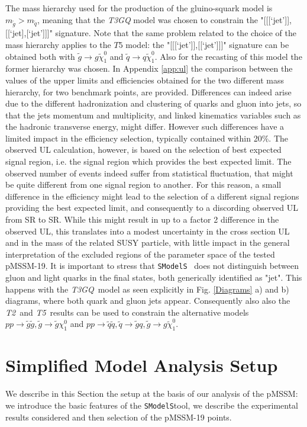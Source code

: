 \documentclass[preprint,number,sort&compress,twocolumn,3p]{elsstyarticle}
\newcommand{\SMO}{\texttt{SModelS\xspace}}
\newcommand{\TGQ}{ \textit{T3GQ}}
\newcommand{\Ttwo}{ \textit{T2}}
\newcommand{\Tfive}{ \textit{T5}}
\begin{document}
The mass hierarchy used for the production of the gluino-squark model is $m_{\tilde g} > m_{\tilde q}$, meaning that the \textit{T3GQ} model was chosen to constrain the "[[[`jet']],[[`jet],[`jet']]]" signature. Note that the same problem related to the choice of the mass hierarchy applies to the $T5$ model: the "[[[`jet']],[[`jet']]]" signature can be obtained both with $\tilde g \rightarrow g \tilde \chi _1 ^0$ and $\tilde q \rightarrow q \tilde \chi _1 ^0$. Also for the recasting of this model the former hierarchy was chosen. In Appendix \ref{app:ul} the comparison between the values of the upper limits and efficiencies obtained for the two different mass hierarchy, for two benchmark points, are provided. Differences can indeed arise due to the different hadronization and clustering of quarks and gluon into jets, so that the jets momentum and multiplicity, and linked kinematics variables such as the hadronic transverse energy, might differ. However such differences have a limited impact in the efficiency selection, typically contained within 20$\%$. The observed UL calculation, however, is based on the selection of best expected signal region, i.e. the signal region which provides the best expected limit. The observed number of events indeed suffer from statistical fluctuation, that might be quite different from one signal region to another. For this reason, a small difference in the efficiency might lead to the selection of a different signal regions providing the best expected limit, and consequently to a discording observed UL from SR to SR. While this might result in up to a factor 2 difference in the observed UL, this translates into a modest uncertainty in the cross section UL and in the mass of the related SUSY particle, with little impact in the general interpretation of the excluded regions of the parameter space of the tested pMSSM-19. 
%
It is important to stress that \SMO~ does not distinguish between gluon and light quarks in the final states, both generically identified as "jet". This happens with the \TGQ~model as seen explicitly in Fig. \ref{Diagrams} a) and b) diagrams, where both quark and gluon jets appear. Consequently also also the \Ttwo~and\Tfive~results can be used to constrain the alternative models $p p \rightarrow \tilde g \tilde g ,\tilde g \rightarrow \tilde g \chi _1 ^0$ and $p p \rightarrow \tilde q \tilde q ,\tilde q \rightarrow \tilde g q, \tilde g \rightarrow g \tilde \chi _1 ^0$.  
%
\section{Simplified Model Analysis Setup}\label{sec::setup}
We describe in this Section the setup at the basis of our analysis of the pMSSM: we introduce the basic features of the \SMO tool, we describe the experimental results considered and then selection of the pMSSM-19 points. 
\end{document}
